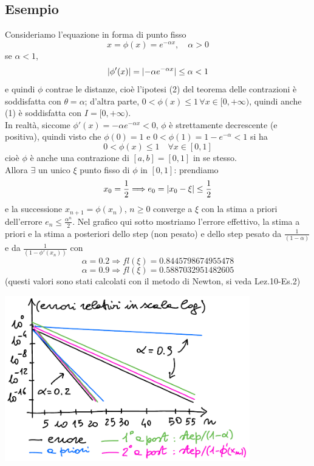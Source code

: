 \documentclass[12pt]{article}
\DeclarePairedDelimiter{\abs}{\lvert}{\rvert}
\begin{document}
\subsection{Esempio}
Consideriamo l'equazione in forma di punto fisso
\[x = \phi(x) = e^{-\alpha x}, \quad \alpha>0\]
se \uline{$\alpha<1$}, 
\[\abs{\phi'(x)} = \abs{-\alpha e^{-\alpha x}} \le \alpha < 1\]
e quindi $\phi$ contrae le distanze, cioè l'ipotesi (2) del teorema delle contrazioni è soddisfatta con $\theta = \alpha$; d'altra parte, $0<\phi(x) \le 1\, \forall x \in [0,+\infty)$, quindi anche (1) è soddisfatta con $I = [0,+\infty)$.\\
In realtà, siccome $\phi'(x)=-\alpha e^{-\alpha x}<0$, $\phi$ è strettamente decrescente (e positiva), quindi visto che $\phi(0)=1$ e $0<\phi(1)=1-e^{-\alpha}<1$ si ha
\[0 < \phi(x) \le 1 \quad \forall x \in [0,1]\]
cioè $\phi$ è anche una contrazione di $[a,b] = [0,1]$ in se stesso.\\
Allora $\exists$ un unico $\xi$ punto fisso di $\phi$ in $[0,1]$: prendiamo 
\[x_0 = \frac{1}{2} \Longrightarrow e_0 = \abs{x_0 - \xi} \le \frac{1}{2}\]
e la successione $x_{n+1}=\phi(x_n)$, $n \ge 0$ converge a $\xi$ con la stima a priori dell'errore $e_n \le \frac{\alpha^n}{2}$.
\newline \newline
Nel grafico qui sotto mostriamo l'errore effettivo, la stima a priori e la stima a posteriori dello step (non pesato) e dello step pesato da $\frac{1}{(1-\alpha)}$ e da $\frac{1}{(1-\phi'(x_n))}$ con
\[\alpha = 0.2 \Longrightarrow fl(\xi) = 0.8445798674955478\]
\[\alpha = 0.9 \Longrightarrow fl(\xi) = 0.5887032951482605\]
(questi valori sono stati calcolati con il metodo di Newton, si veda Lez.10-Es.2)
\begin{center}
    \includegraphics[width=0.8\textwidth]{pag16}
\end{center}
\end{document}

